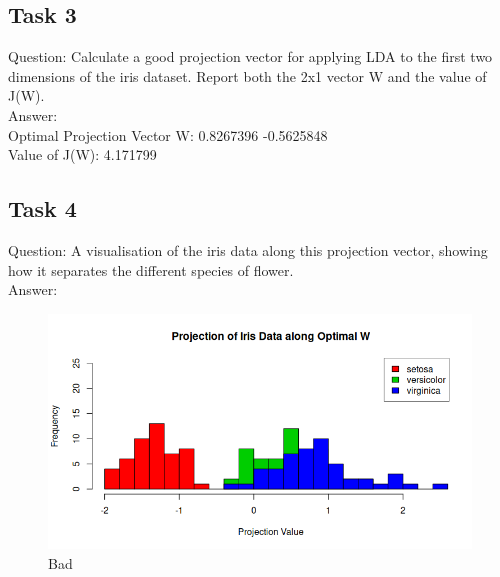 \documentclass[12pt,a4paper]{report}
\begin{document}
\subsection{Task 3}
Question: Calculate a good projection vector for applying LDA to the first two dimensions of the
iris dataset. Report both the 2x1 vector W and the value of J(W).
\\
Answer: \\
Optimal Projection Vector W: 0.8267396 -0.5625848\\
Value of J(W): 4.171799 

\subsection{Task 4}
Question: A visualisation of the iris data along this projection vector, showing how it separates
the different species of flower.
\\
Answer:
\begin{figure}[H]
\centering
\includegraphics[width=\textwidth]{../Code/week12/task 3.png}
\caption{Bad}
\end{figure}
\end{document}
